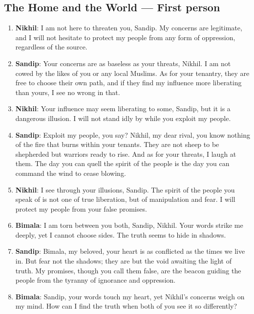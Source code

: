\documentclass[10pt]{article}
\begin{document}
\subsection*{The Home and the World --- First person}

\begin{enumerate}\setlength{\itemsep}{1pt}\small

\item \textbf{Nikhil}: I am not here to threaten you, Sandip. My concerns are legitimate, and I will not hesitate to protect my people from any form of oppression, regardless of the source.

\item \textbf{Sandip}: Your concerns are as baseless as your threats, Nikhil. I am not cowed by the likes of you or any local Muslims. As for your tenantry, they are free to choose their own path, and if they find my influence more liberating than yours, I see no wrong in that.

\item \textbf{Nikhil}: Your influence may seem liberating to some, Sandip, but it is a dangerous illusion. I will not stand idly by while you exploit my people.

\item \textbf{Sandip}: Exploit my people, you say? Nikhil, my dear rival, you know nothing of the fire that burns within your tenants. They are not sheep to be shepherded but warriors ready to rise. And as for your threats, I laugh at them. The day you can quell the spirit of the people is the day you can command the wind to cease blowing.

\item \textbf{Nikhil}: I see through your illusions, Sandip. The spirit of the people you speak of is not one of true liberation, but of manipulation and fear. I will protect my people from your false promises.

\item \textbf{Bimala}: I am torn between you both, Sandip, Nikhil. Your words strike me deeply, yet I cannot choose sides. The truth seems to hide in shadows.

\item \textbf{Sandip}: Bimala, my beloved, your heart is as conflicted as the times we live in. But fear not the shadows; they are but the void awaiting the light of truth. My promises, though you call them false, are the beacon guiding the people from the tyranny of ignorance and oppression.

\item \textbf{Bimala}: Sandip, your words touch my heart, yet Nikhil's concerns weigh on my mind. How can I find the truth when both of you see it so differently?


\end{enumerate}
\end{document}
